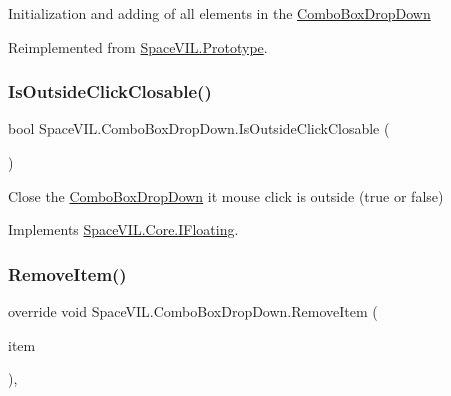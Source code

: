 Initialization and adding of all elements in the \mbox{\hyperlink{class_space_v_i_l_1_1_combo_box_drop_down}{Combo\+Box\+Drop\+Down}} 



Reimplemented from \mbox{\hyperlink{class_space_v_i_l_1_1_prototype_ac3379fe02923ee155b5b0084abf27420}{Space\+V\+I\+L.\+Prototype}}.

\mbox{\label{class_space_v_i_l_1_1_combo_box_drop_down_a9c7ae751788129978bd5977e1295ba47}} 
\subsubsection{\texorpdfstring{Is\+Outside\+Click\+Closable()}{IsOutsideClickClosable()}}
{\footnotesize\ttfamily bool Space\+V\+I\+L.\+Combo\+Box\+Drop\+Down.\+Is\+Outside\+Click\+Closable (\begin{DoxyParamCaption}{ }\end{DoxyParamCaption})\hspace{0.3cm}{\ttfamily [inline]}}



Close the \mbox{\hyperlink{class_space_v_i_l_1_1_combo_box_drop_down}{Combo\+Box\+Drop\+Down}} it mouse click is outside (true or false) 



Implements \mbox{\hyperlink{interface_space_v_i_l_1_1_core_1_1_i_floating}{Space\+V\+I\+L.\+Core.\+I\+Floating}}.

\mbox{\label{class_space_v_i_l_1_1_combo_box_drop_down_a78a089740c66f8d4cf151da273eafd73}} 
\subsubsection{\texorpdfstring{Remove\+Item()}{RemoveItem()}}
{\footnotesize\ttfamily override void Space\+V\+I\+L.\+Combo\+Box\+Drop\+Down.\+Remove\+Item (\begin{DoxyParamCaption}\item[{\mbox{\hyperlink{interface_space_v_i_l_1_1_core_1_1_i_base_item}{I\+Base\+Item}}}]{item }\end{DoxyParamCaption})\hspace{0.3cm}{\ttfamily [inline]}, {\ttfamily [virtual]}}



